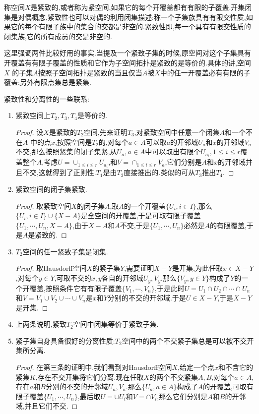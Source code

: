 称空间$X$是紧致的,或者称为紧空间,如果它的每个开覆盖都有有限的子覆盖.开集闭集是对偶概念,紧致性也可以对偶的利用闭集描述:称一个子集族具有有限交性质,如果它的每个有限子族中的集合的交都是非空的.紧致性即,每一个具有有限交性质的闭集族,它的所有成员的交是非空的.

这里强调两件比较好用的事实.当提及一个紧致子集的时候,原空间对这个子集具有开覆盖有有限子覆盖的性质和它作为子空间拓扑是紧致的是等价的.具体的讲,空间$X$ 的子集$A$按照子空间拓扑是紧致的当且仅当$A$被$X$中的任一开覆盖必有有限的子覆盖;另外有限点集总是紧集.

紧致性和分离性的一些联系:
\begin{enumerate}
	\item 紧致空间上$T_2,T_3,T_4$是等价的.
	\begin{proof}
		
		设$X$是紧致的$T_2$空间,先来证明$T_3$,对紧致空间中任意一个闭集$A$和一个不在$A$ 中的点$x$,按照空间是$T_2$的,对每个$a\in A$可以取$a$的开邻域$U_a$和$x$的开邻域$V_a$不交,那么按照紧集的闭子集紧,从$U_a,a\in A$中可以取出有限个$U_{a_i},1\le i\le r$覆盖整个$A$,考虑$U=\cup_{1\le i\le r}U_{a_i}$,和$V=\cap_{1\le i\le r}V_{a}$,它们分别是$A$和$x$的开邻域并且不交,这就得到了正则性.$T_1$是由$T_2$直接推出的.类似的可从$T_3$推出$T_4$.
	\end{proof}
	\item 紧致空间的闭子集紧致.
	\begin{proof}
	
	取紧致空间$X$的闭子集$A$,取$A$的一个开覆盖$\{U_i,i\in I\}$,那么$\{U_i,i\in I\}\cup\{X-A\}$是全空间的开覆盖,于是可取有限子覆盖$\{U_1,\cdots,U_n,X-A\}$,由于$X-A$和$A$不交,于是$\{U_1,\cdots,U_n\}$必然是$A$的有限覆盖,于是$A$是紧致的.
	\end{proof}
    \item $T_2$空间的任一紧致子集是闭集.
    \begin{proof}
    
    取Hausdorff空间$X$的紧子集$Y$,需要证明$X-Y$是开集,为此任取$x\in X-Y$,对每个$y\in Y$,可取不交的$x,y$各自的开邻域$U_y,V_y$.那么$\{V_y,y\in Y\}$构成了$Y$的一个开覆盖,按照条件它有有限子覆盖$\{V_1,\cdots,V_n\}$,于是此时$U=U_1\cap U_2\cap\cdots\cap U_n$和$V=V_1\cup V_2\cup\cdots\cup V_n$是$x$和$Y$分别的不交的开邻域.于是$U\in X-Y$,于是$X-Y$是开集.
    \end{proof}
    \item 上两条说明,紧致$T_2$空间中闭集等价于紧致子集.
    \item 紧子集自身具备很好的分离性质:$T_2$空间中的两个不交紧子集总是可以被不交开集所分离.
    \begin{proof}
    	
    	在第三条的证明中,我们看到对Hausdorff空间$X$,给定一个点$x$和不含它的紧集$K$,存在不交开集将它们分离.现在任取$X$的两个不交紧集$A,B$,对每个$a\in A$,存在$a$和$B$分别的不交的开邻域$U_a,V_a$.那么$\{U_a,a\in A\}$构成了$A$的开覆盖,可取有限子覆盖$\{U_1,\cdots,U_n\}$,最后取$U=\cup U_i$和$V=\cap V_i$,那么它们分别是$A$和$B$的开邻域,并且它们不交.
    \end{proof}
\end{enumerate}

